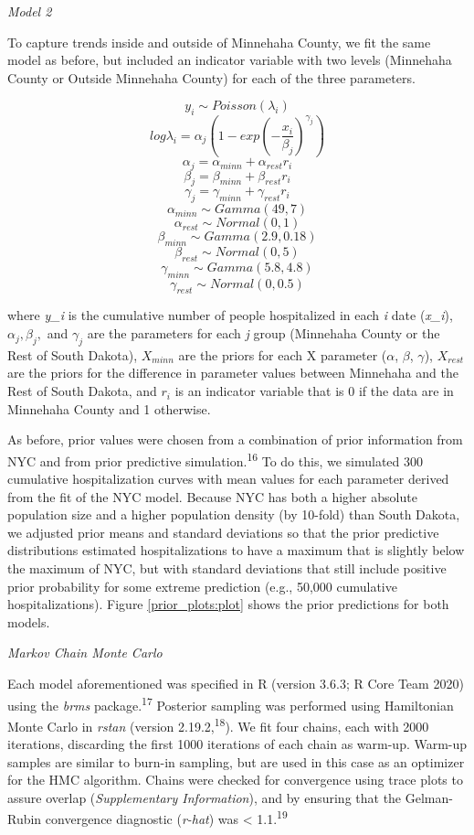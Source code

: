 \documentclass[
]{article}
\begin{document}
\emph{Model 2}

To capture trends inside and outside of Minnehaha County, we fit the same model as before, but included an indicator variable with two levels (Minnehaha County or Outside Minnehaha County) for each of the three parameters.

\[y_i \sim Poisson(\lambda_i)\]
\[log\lambda_i = \alpha_j(1 - exp(-\frac{x_i}{\beta_j})^{\gamma_j})\]
\[\alpha_j = \alpha_{minn} + \alpha_{rest}r_i\]
\[\beta_j = \beta_{minn} + \beta_{rest}r_i\]
\[\gamma_j = \gamma_{minn} + \gamma_{rest}r_i\]
\[\alpha_{minn} \sim Gamma(49,7)\]
\[\alpha_{rest} \sim Normal(0,1)\]
\[\beta_{minn} \sim Gamma(2.9, 0.18)\]
\[\beta_{rest} \sim Normal(0, 5)\]
\[\gamma_{minn} \sim Gamma(5.8, 4.8)\]
\[\gamma_{rest} \sim Normal(0,0.5)\]

where \emph{y_i} is the cumulative number of people hospitalized in each \emph{i} date (\emph{x_i}), \(\alpha_j, \beta_j,\) and \(\gamma_j\) are the parameters for each \emph{j} group (Minnehaha County or the Rest of South Dakota), \(X_{minn}\) are the priors for each X parameter (\(\alpha\), \(\beta\), \(\gamma\)), \(X_{rest}\) are the priors for the difference in parameter values between Minnehaha and the Rest of South Dakota, and \(r_i\) is an indicator variable that is 0 if the data are in Minnehaha County and 1 otherwise.

As before, prior values were chosen from a combination of prior information from NYC and from prior predictive simulation.\textsuperscript{16} To do this, we simulated 300 cumulative hospitalization curves with mean values for each parameter derived from the fit of the NYC model. Because NYC has both a higher absolute population size and a higher population density (by 10-fold) than South Dakota, we adjusted prior means and standard deviations so that the prior predictive distributions estimated hospitalizations to have a maximum that is slightly below the maximum of NYC, but with standard deviations that still include positive prior probability for some extreme prediction (e.g., 50,000 cumulative hospitalizations). Figure \ref{prior_plots:plot} shows the prior predictions for both models.

\emph{Markov Chain Monte Carlo}

Each model aforementioned was specified in R (version 3.6.3; R Core Team 2020) using the \emph{brms} package.\textsuperscript{17} Posterior sampling was performed using Hamiltonian Monte Carlo in \emph{rstan} (version 2.19.2,\textsuperscript{18}). We fit four chains, each with 2000 iterations, discarding the first 1000 iterations of each chain as warm-up. Warm-up samples are similar to burn-in sampling, but are used in this case as an optimizer for the HMC algorithm. Chains were checked for convergence using trace plots to assure overlap (\emph{Supplementary Information}), and by ensuring that the Gelman-Rubin convergence diagnostic (\emph{r-hat}) was \textless{} 1.1.\textsuperscript{19}
\end{document}
